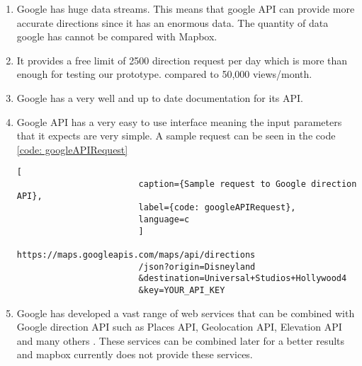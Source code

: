            \begin{enumerate}  
                \item 
                    Google has huge data streams. This means that google API can provide more
                    accurate directions since it has an enormous data. The quantity
                    of data google has cannot be compared with Mapbox.
                \item
                    It provides a free limit of 2500 direction request per day which is more than enough for testing our prototype.
                    compared to  50,000 views/month.
                \item
                    Google has a very well and up to date documentation for its API.  
                \item
                    Google API has a very easy to use interface meaning the input 
                    parameters that it expects are very simple. 
                    A sample request can be seen in the code \ref{code: googleAPIRequest}
                    \begin{lstlisting}[
                        caption={Sample request to Google direction API}, 
                        label={code: googleAPIRequest},
                        language=c
                        ]
                        https://maps.googleapis.com/maps/api/directions
                        /json?origin=Disneyland
                        &destination=Universal+Studios+Hollywood4
                        &key=YOUR_API_KEY
                    \end{lstlisting}   
                \item 
                    Google has developed a vast range of web services that can be
                    combined with
                    Google direction API such as  
                    Places API, Geolocation API,
                    Elevation API and many others \cite{GoogleWebServices}. 
                    These services can be combined later for a better results and mapbox 
                    currently does not provide these services. 
            \end{enumerate}
